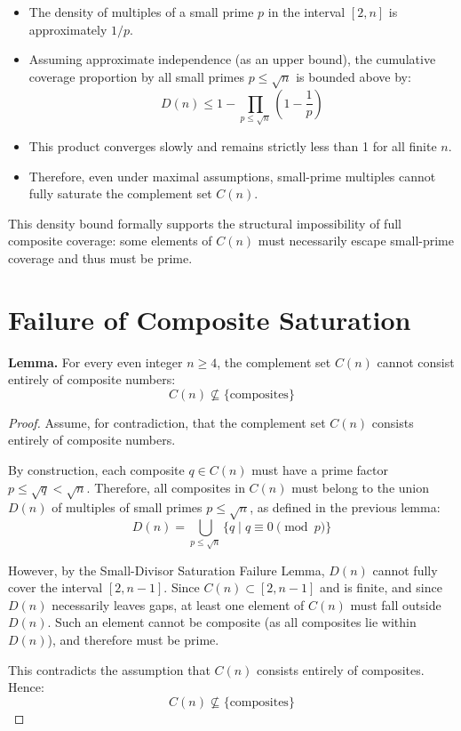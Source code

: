 \documentclass[11pt]{article}
\begin{document}
	\begin{itemize}
		\item The density of multiples of a small prime \( p \) in the interval \([2, n]\) is approximately \( 1/p \).
		\item Assuming approximate independence (as an upper bound), the cumulative coverage proportion by all small primes \( p \leq \sqrt{n} \) is bounded above by:
		\[
		D(n) \leq 1 - \prod_{p \leq \sqrt{n}} \left(1 - \frac{1}{p}\right)
		\]
		\item This product converges slowly and remains strictly less than 1 for all finite \( n \).
		\item Therefore, even under maximal assumptions, small-prime multiples cannot fully saturate the complement set \( C(n) \).
	\end{itemize}
	
	This density bound formally supports the structural impossibility of full composite coverage: some elements of \( C(n) \) must necessarily escape small-prime coverage and thus must be prime.

	


	\section{Failure of Composite Saturation}
	
	\textbf{Lemma.}  
	For every even integer \( n \geq 4 \), the complement set \( C(n) \) cannot consist entirely of composite numbers:
	\[
	C(n) \not\subseteq \{\text{composites}\}
	\]
	
	\begin{proof}
		Assume, for contradiction, that the complement set \( C(n) \) consists entirely of composite numbers.
		
		By construction, each composite \( q \in C(n) \) must have a prime factor \( p \leq \sqrt{q} < \sqrt{n} \). Therefore, all composites in \( C(n) \) must belong to the union \( D(n) \) of multiples of small primes \( p \leq \sqrt{n} \), as defined in the previous lemma:
		\[
		D(n) = \bigcup_{p \leq \sqrt{n}} \{ q \mid q \equiv 0 \pmod{p} \}
		\]
		
		However, by the Small-Divisor Saturation Failure Lemma, \( D(n) \) cannot fully cover the interval \([2, n-1]\). Since \( C(n) \subset [2, n-1] \) and is finite, and since \( D(n) \) necessarily leaves gaps, at least one element of \( C(n) \) must fall outside \( D(n) \). Such an element cannot be composite (as all composites lie within \( D(n) \)), and therefore must be prime.
		
		This contradicts the assumption that \( C(n) \) consists entirely of composites. Hence:
		\[
		C(n) \not\subseteq \{\text{composites}\}
		\]
	\end{proof}
\end{document}
